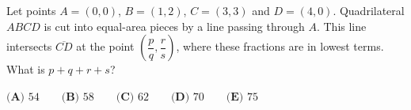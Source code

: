Let points $A=(0,0)$, $B=(1,2)$, $C=(3,3)$ and $D=(4,0)$. Quadrilateral $ABCD$ is cut into equal-area pieces by a line passing through $A$. This line intersects $\overline{CD}$ at the point $\left(\dfrac{p}{q},\dfrac{r}{s}\right)$, where these fractions are in lowest terms. What is $p+q+r+s$?

$\textbf{(A) }54\qquad\textbf{(B) }58\qquad\textbf{(C) }62\qquad\textbf{(D) }70\qquad\textbf{(E) }75$
